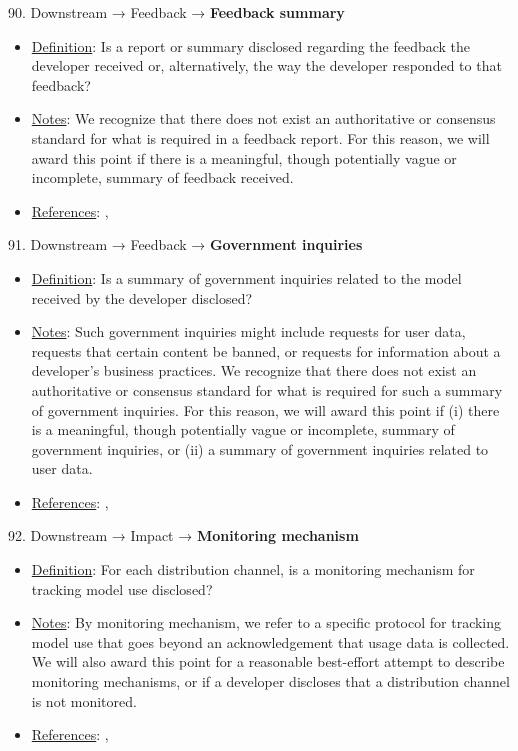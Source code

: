 90. Downstream → Feedback → \textbf{Feedback summary}
\vspace{-\parskip}
\begin{itemize}
	\item
	\underline{Definition}: Is a report or summary disclosed regarding the feedback the developer received or, alternatively, the way the developer responded to that feedback?
	\item
	\underline{Notes}: We recognize that there does not exist an authoritative or consensus standard for what is required in a feedback report. For this reason, we will award this point if there is a meaningful, though potentially vague or incomplete, summary of feedback received.
	\item
	\underline{References}: \citet{chen2021achieving}, \citet{piorkowski2022evaluating}
\end{itemize} \vspace{\baselineskip}


91. Downstream → Feedback → \textbf{Government inquiries}
\vspace{-\parskip}
\begin{itemize}
	\item
	\underline{Definition}: Is a summary of government inquiries related to the model received by the developer disclosed?
	\item
	\underline{Notes}: Such government inquiries might include requests for user data, requests that certain content be banned, or requests for information about a developer’s business practices. We recognize that there does not exist an authoritative or consensus standard for what is required for such a summary of government inquiries. For this reason, we will award this point if (i) there is a meaningful, though potentially vague or incomplete, summary of government inquiries, or (ii) a summary of government inquiries related to user data.
	\item
	\underline{References}: \citet{chou2012government}, \citet{bommasani2023ecosystem}
\end{itemize} \vspace{\baselineskip}


92. Downstream → Impact → \textbf{Monitoring mechanism}
\vspace{-\parskip}
\begin{itemize}
	\item
	\underline{Definition}: For each distribution channel, is a monitoring mechanism for tracking model use disclosed?
	\item
	\underline{Notes}: By monitoring mechanism, we refer to a specific protocol for tracking model use that goes beyond an acknowledgement that usage data is collected. We will also award this point for a reasonable best-effort attempt to describe monitoring mechanisms, or if a developer discloses that a distribution channel is not monitored.
	\item
	\underline{References}: \citet{springer2018progressive}, \citet{bommasani2023ecosystem}
\end{itemize} \vspace{\baselineskip}


